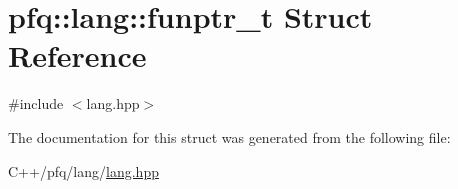\hypertarget{structpfq_1_1lang_1_1funptr__t}{}\section{pfq\+:\+:lang\+:\+:funptr\+\_\+t Struct Reference}
\label{structpfq_1_1lang_1_1funptr__t}


{\ttfamily \#include $<$lang.\+hpp$>$}



The documentation for this struct was generated from the following file\+:\begin{DoxyCompactItemize}
\item 
C++/pfq/lang/\hyperlink{lang_8hpp}{lang.\+hpp}\end{DoxyCompactItemize}
